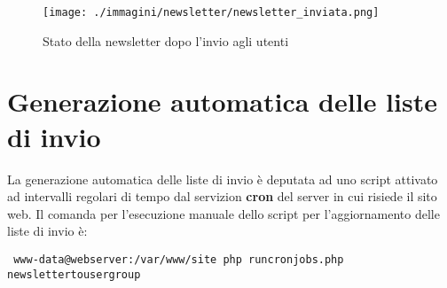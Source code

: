 \begin{figure}[H]
 \centering
 \texttt{[image: ./immagini/newsletter/newsletter\_inviata.png]}
 \caption{Stato della newsletter dopo l'invio agli utenti}
 \label{fig:newsletter_inviata}
\end{figure}

\section{Generazione automatica delle liste di invio}
 La generazione automatica delle liste di invio è deputata ad uno script attivato ad intervalli regolari di tempo dal servizion \textbf{cron} del server in cui risiede il sito web. Il comanda per l'esecuzione manuale dello script per l'aggiornamento delle liste di invio è:

\begin{verbatim}
 www-data@webserver:/var/www/site php runcronjobs.php newslettertousergroup
\end{verbatim}





